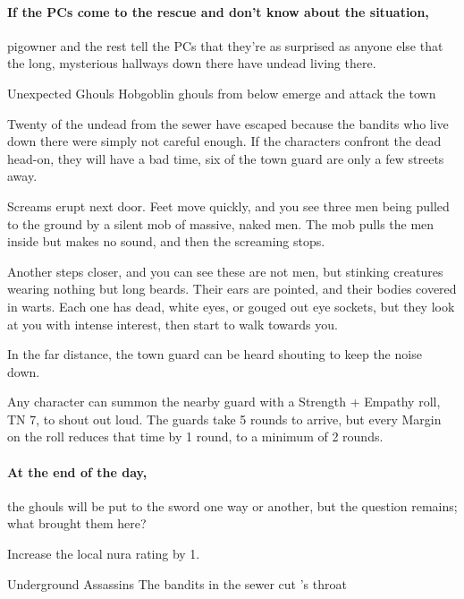 \begin{multicols}{2}
\paragraph{If the PCs come to the rescue and don't know about the situation,}
\gls{pigowner} and the rest tell the PCs that they're as surprised as anyone else that the long, mysterious hallways down there have undead living there.

{\N \N Unexpected Ghouls}%
{Hobgoblin ghouls from below emerge and attack the town}%

Twenty of the undead from the sewer have escaped because the bandits who live down there were simply not careful enough.  If the characters confront the dead head-on, they will have a bad time, six of the town guard are only a few streets away.

\begin{boxtext}

	Screams erupt next door.
	Feet move quickly, and you see three men being pulled to the ground by a silent mob of massive, naked men.
	The mob pulls the men inside but makes no sound, and then the screaming stops.

	Another steps closer, and you can see these are not men, but stinking creatures wearing nothing but long beards.
	Their ears are pointed, and their bodies covered in warts.
	Each one has dead, white eyes, or gouged out eye sockets, but they look at you with intense interest, then start to walk towards you.

	In the far distance, the town guard can be heard shouting to keep the noise down.

\end{boxtext}

Any character can summon the nearby guard with a Strength + Empathy roll, TN 7, to shout out loud.
The guards take 5 rounds to arrive, but every Margin on the roll reduces that time by 1 round, to a minimum of 2 rounds.

\paragraph{At the end of the day,}
the ghouls will be put to the sword one way or another, but the question remains; what brought them here?


Increase the local nura rating by 1.

{\N Underground Assassins}%
{The bandits in the sewer cut 's throat}%


\end{multicols}

